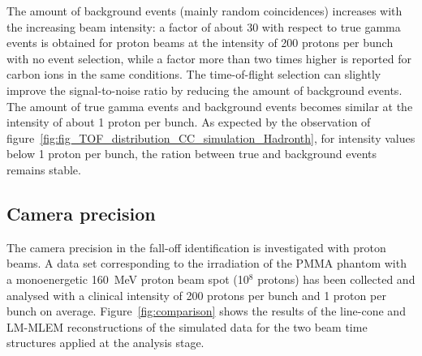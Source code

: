 The amount of background events (mainly random coincidences) increases with the increasing beam intensity: a factor of about 30 with respect to true gamma events is obtained for proton beams at  the intensity of 200 protons per bunch with no event selection, while a factor more than two times higher is reported for carbon ions in the same conditions. The time-of-flight selection can slightly improve the signal-to-noise ratio by reducing the amount of background events. The amount of true gamma events and background events becomes similar at the intensity of about 1 proton per bunch. As expected by the observation of figure~\ref{fig:fig_TOF_distribution_CC_simulation_Hadronth}, for intensity values below 1 proton per bunch, the ration between true and background events remains stable. 


\subsection{Camera precision}
\label{Results::precision_reconstruction}
The camera precision in the fall-off identification is investigated with proton beams.
A data set corresponding to the irradiation of the PMMA phantom with a monoenergetic 160~MeV proton beam spot (10$^8$ protons) has been collected and analysed with a clinical intensity of 200 protons per bunch and 1 proton per bunch on average. 
Figure~\ref{fig:comparison} shows the results of the line-cone and LM-MLEM reconstructions of the simulated data for the two beam time structures applied at the analysis stage.  

